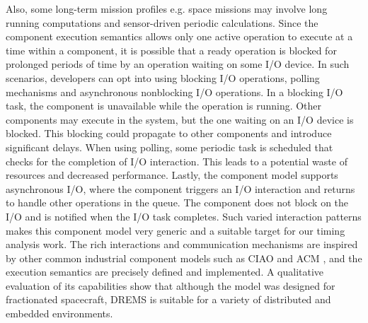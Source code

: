 Also, some long-term mission profiles e.g. space missions may involve long running computations and sensor-driven periodic calculations. Since the component execution semantics allows only one active operation to execute at a time within a component, it is possible that a ready operation is blocked for prolonged periods of time by an operation waiting on some I/O device. In such scenarios, developers can opt into using blocking I/O operations, polling mechanisms and asynchronous nonblocking I/O operations. In a blocking I/O task, the component is unavailable while the operation is running. Other components may execute in the system, but the one waiting on an I/O device is blocked. This blocking could propagate to other components and introduce significant delays. When using polling, some periodic task is scheduled that checks for the completion of I/O interaction. This leads to a potential waste of resources and decreased performance. Lastly, the component model supports asynchronous I/O, where the component triggers an I/O interaction and returns to handle other operations in the queue. The component does not block on the I/O and is notified when the I/O task completes. Such varied interaction patterns makes this component model very generic and a suitable target for our timing analysis work. The rich interactions and communication mechanisms are inspired by other common industrial component models such as CIAO \cite{CIAO_Chap:04} and ACM \cite{ACM_SPE:10}, and the execution semantics are precisely defined and implemented. A qualitative evaluation of its capabilities \cite{ISIS_F6_ISORC:13} show that although the model was designed for fractionated spacecraft, DREMS is suitable for a variety of distributed and embedded environments. 
